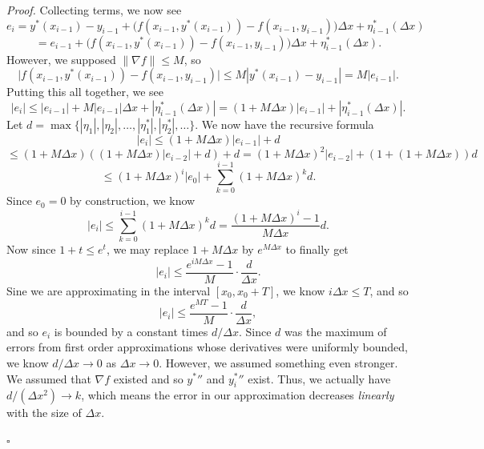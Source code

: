 \documentclass{problemset}
\newenvironment{proof}{\emph{Proof.}}{\hfill$\square$}
\begin{document}
\begin{proof}
		Collecting terms, we now see
		\[
			e_i = y^*(x_{i-1})-y_{i-1} + \Big(f(x_{i-1}, y^*(x_{i-1})) - f(x_{i-1}, y_{i-1}) \Big)\Delta x + \eta^*_{i-1}(\Delta x)
		\]\[
			=e_{i-1} + \Big(f(x_{i-1}, y^*(x_{i-1})) - f(x_{i-1}, y_{i-1}) \Big)\Delta x + \eta^*_{i-1}(\Delta x).
		\]
		However, we supposed $\|\nabla f\| \leq M$, so 
		\[
			\big|f(x_{i-1}, y^*(x_{i-1})) - f(x_{i-1}, y_{i-1})\big| \leq M|y^*(x_{i-1}) -  y_{i-1}|
			= M|e_{i-1}|.
		\]
		Putting this all together, we see
		\[
			|e_i| \leq |e_{i-1}| + M|e_{i-1}|\Delta x + |\eta^*_{i-1}(\Delta x)|
			= (1+M\Delta x)|e_{i-1}| + |\eta^*_{i-1}(\Delta x)|.
		\]
		Let $d = \max\{|\eta_1|,|\eta_2|,\ldots,|\eta_1^*|,|\eta_2^*|,\ldots\}$.  We now have the recursive formula
		\[
			|e_i| \leq  (1+M\Delta x)|e_{i-1}| + d
		\]
		\[
			\leq (1+M\Delta x)((1+M\Delta x)|e_{i-2}| + d) + d = (1+M\Delta x)^2|e_{i-2}| + (1+(1+M\Delta x))d
		\]
		\[
			\leq (1+M\Delta x)^i|e_{0}| + \sum_{k=0}^{i-1} (1+M\Delta x)^k d.
		\]
		Since $e_0=0$ by construction, we know
		\[
			|e_i| \leq \sum_{k=0}^{i-1} (1+M\Delta x)^k d  = \frac{(1+M\Delta x)^i - 1}{M\Delta x} d.
		\]
		Now since $1+t \leq e^t$, we may replace $1+M\Delta x$ by $e^{M\Delta x}$ to finally get
		\[
			|e_i| \leq \frac{e^{iM\Delta x}-1}{M}\cdot \frac{d}{\Delta x}.
		\]
		Sine we are approximating in the interval $[x_0,x_0+T]$, we know $i\Delta x\leq T$, and so
		\[
			|e_i| \leq \frac{e^{MT}-1}{M}\cdot \frac{d}{\Delta x},
		\]
		and so $e_i$ is bounded by a constant times $d/\Delta x$.  Since $d$ was the maximum of errors
		from first order approximations whose derivatives were uniformly bounded, we know $d/\Delta x\to 0$
		as $\Delta x\to 0$.  However, we assumed something even stronger.  We assumed that
		$\nabla f$ existed and so ${y^*}''$ and ${y^*_i}''$ exist.  Thus, we actually have $d/(\Delta x^2)\to k$,
		which means the error in our approximation decreases \emph{linearly} with the size of $\Delta x$.
		


	\end{proof}
\end{document}
